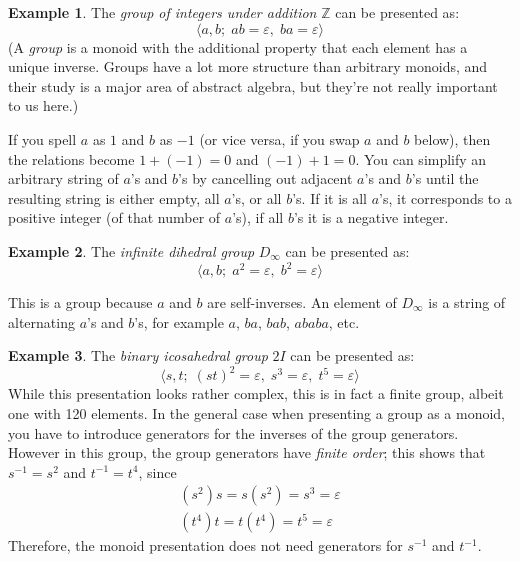 \documentclass[headsepline,bibliography=totoc]{scrreport}
\theoremstyle{definition}
\newtheorem{example}{Example}[chapter]
\theoremstyle{definition}
\theoremstyle{definition}
\begin{document}
\begin{example}
The \emph{group of integers under addition} $\mathbb{Z}$ can be presented as:
\[\langle a, b;\;ab=\varepsilon,\;ba=\varepsilon\rangle\]
(A \emph{group} is a monoid with the additional property that each element has a unique inverse. Groups have a lot more structure than arbitrary monoids, and their study is a major area of abstract algebra, but they're not really important to us here.)

If you spell $a$ as $1$ and $b$ as $-1$ (or vice versa, if you swap $a$ and $b$ below), then the relations become $1+(-1)=0$ and $(-1)+1=0$. You can simplify an arbitrary string of $a$'s and $b$'s by cancelling out adjacent $a$'s and $b$'s until the resulting string is either empty, all $a$'s, or all $b$'s. If it is all $a$'s, it corresponds to a positive integer (of that number of $a$'s), if all $b$'s it is a negative integer.
\end{example}

\begin{example}
The \emph{infinite dihedral group} $D_\infty$ can be presented as:
\[\langle a, b;\; a^2=\varepsilon,\; b^2=\varepsilon\rangle\]

This is a group because $a$ and $b$ are self-inverses. An element of $D_\infty$ is a string of alternating $a$'s and $b$'s, for example $a$, $ba$, $bab$, $ababa$, etc.
\end{example}

\begin{example}
The \emph{binary icosahedral group} $2I$ can be presented as:
\[\langle s, t;\; (st)^2=\varepsilon,\; s^3=\varepsilon,\; t^5=\varepsilon\rangle\]
While this presentation looks rather complex, this is in fact a finite group, albeit one with 120 elements. In the general case when presenting a group as a monoid, you have to introduce generators for the inverses of the group generators. However in this group, the group generators have \emph{finite order}; this shows that $s^{-1}=s^2$ and $t^{-1}=t^4$, since
\begin{align*}
(s^2)s=s(s^2)=s^3=\varepsilon\\
(t^4)t=t(t^4)=t^5=\varepsilon
\end{align*}
Therefore, the monoid presentation does not need generators for $s^{-1}$ and $t^{-1}$.
\end{example}
\end{document}
